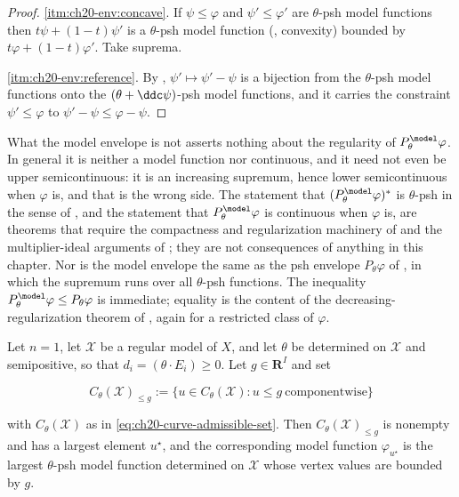 \begin{proof}
\cref{itm:ch20-env:concave}.  If $\psi\leq\varphi$ and
$\psi'\leq\varphi'$ are $\theta$-psh model functions then
$t\psi+(1-t)\psi'$ is a $\theta$-psh model function
(, convexity) bounded by
$t\varphi+(1-t)\varphi'$.  Take suprema.

\cref{itm:ch20-env:reference}.  By ,
$\psi'\mapsto\psi'-\psi$ is a bijection from the $\theta$-psh model
functions onto the $(\theta+\ddc\psi)$-psh model functions, and it carries
the constraint $\psi'\leq\varphi$ to $\psi'-\psi\leq\varphi-\psi$.
\end{proof}

\begin{warning}{What the model envelope is not}
 asserts nothing about the regularity of
$P^{\model}_\theta\varphi$.  In general it is neither a model function nor
continuous, and it need not even be upper semicontinuous: it is an
increasing supremum, hence lower semicontinuous when $\varphi$ is, and
that is the wrong side.  The statement that
$(P^{\model}_\theta\varphi)^*$ is $\theta$-psh in the sense of
, and the statement that
$P^{\model}_\theta\varphi$ is continuous when $\varphi$ is, are theorems
that require the compactness and regularization machinery of
 and the multiplier-ideal arguments of
; they are not consequences of anything in this
chapter.  Nor is the model envelope the same as the psh envelope
$P_\theta\varphi$ of , in which the supremum runs
over all $\theta$-psh functions.  The inequality
$P^{\model}_\theta\varphi\leq P_\theta\varphi$ is immediate; equality is
the content of the decreasing-regularization theorem of
, again for a restricted class of $\varphi$.
\end{warning}

\begin{proposition}
\label{prop:ch20-curve-envelope}
Let $n=1$, let $\mathcal X$ be a regular model of $X$, and let
$\theta$ be determined on $\mathcal X$ and semipositive, so that
$d_i=(\theta\cdot E_i)\geq0$.  Let $g\in\mathbf R^I$ and set

\[
 C_\theta(\mathcal X)_{\le g}
 :=\{u\in C_\theta(\mathcal X):u\leq g\ \text{componentwise}\}
\]

with $C_\theta(\mathcal X)$ as in
\eqref{eq:ch20-curve-admissible-set}.  Then
$C_\theta(\mathcal X)_{\le g}$ is nonempty and has a largest element
$u^\star$, and the corresponding model function
$\varphi_{u^\star}$ is the largest $\theta$-psh model function
determined on $\mathcal X$ whose vertex values are bounded by $g$.
\end{proposition}

